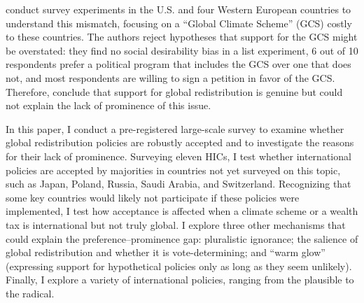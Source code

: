 \documentclass[12pt,english]{article}
\begin{document}
\begin{bibunit}
\cite{fabre_majority_2025} conduct survey experiments in the U.S. and four Western European countries to understand this mismatch, focusing on a ``Global Climate Scheme'' (GCS) costly to these countries. The authors reject hypotheses that support for the GCS might be overstated: they find no social desirability bias in a list experiment, 6 out of 10 respondents prefer a political program that includes the GCS over one that does not, and most respondents are willing to sign a petition in favor of the GCS.
Therefore, \cite{fabre_majority_2025} conclude that support for global redistribution is genuine but could not explain the lack of prominence of this issue.

In this paper, I conduct a pre-registered large-scale survey to examine whether global redistribution policies are robustly accepted and to investigate the reasons for their lack of prominence. Surveying eleven HICs, I test whether international policies are accepted by majorities in countries not yet surveyed on this topic, such as Japan, Poland, Russia, Saudi Arabia, and Switzerland. Recognizing that some key countries would likely not participate if these policies were implemented, I test how acceptance is affected when a climate scheme or a wealth tax is international but not truly global. I explore three other mechanisms that could explain the preference--prominence gap: pluralistic ignorance; the salience of global redistribution and whether it is vote-determining; and ``warm glow'' (expressing support for hypothetical policies only as long as they seem unlikely). Finally, I explore a variety of international policies, ranging from the plausible to the radical.



\end{bibunit}
\end{document}

